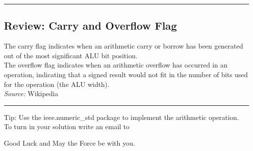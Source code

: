 \documentclass[a4paper,12pt]{article}
\begin{document}
\rule{16cm}{0.4pt}\par
 \subsection*{Review: Carry and Overflow Flag}
The carry flag indicates when an arithmetic carry or borrow has been generated out of the most significant ALU bit position. \\


The overflow flag indicates when an arithmetic overflow has occurred in an operation, indicating that a signed result would not fit in the number of bits used for the operation (the ALU width).\\


\textit{Source: }Wikipedia
\\
\rule{16cm}{0.4pt}

\vspace{0.3cm}

Tip: Use the ieee.numeric\_std package to implement the arithmetic operation.
\\

To turn in your solution write an email to %

\vspace{0.7cm}
Good Luck and May the Force be with you.
\end{document}

